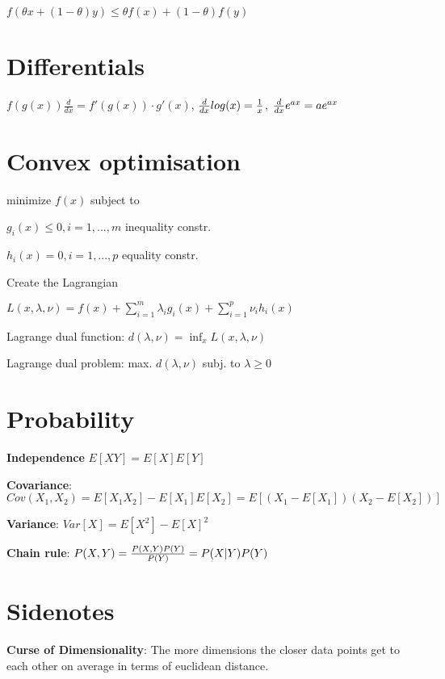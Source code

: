 \documentclass[a4paper,11pt,twocolumn]{article}
\begin{document}
$f(\theta x + (1-\theta)y) \leq \theta f(x) + (1-\theta) f(y)$

\section{Differentials}

$ f(g(x)) \frac{d}{dx} = f'(g(x)) \cdot g'(x)$, $ {d \over {dx}} log(x) = {1 \over x}$, $ {d \over {dx}} e^{ax} = ae^{ax}$



\section{Convex optimisation}

minimize $f(x)$ subject to 

$g_i(x) \leq 0, i = 1,...,m$ inequality constr.

$h_i(x) = 0, i = 1,...,p$ equality constr.

Create the Lagrangian

$L(x, \lambda, \nu) = f(x) + \sum_{i=1}^m{\lambda_i g_i(x) + \sum_{i=1}^p{\nu_i h_i(x)}}$

Lagrange dual function: $ d(\lambda, \nu) = \inf_{x} L (x,\lambda, \nu) $

Lagrange dual problem: max. $d(\lambda, \nu)$  subj. to $\lambda \geq 0$

\section{Probability}

\textbf{Independence} $E[XY] = E[X] E[Y]$

\textbf{Covariance}: $Cov(X_1, X_2) = E[X_1 X_2] - E[X_1] E[X_2] = E[(X_1 - E[X_1])(X_2-E[X_2])]$

\textbf{Variance}: $Var[X] = E[X^2] - E[X]^2$


\textbf{Chain rule}: $P(X,Y) = {{P(X,Y)P(Y)}\over{P(Y)}} = P(X|Y)P(Y)$

\section{Sidenotes}

\textbf{Curse of Dimensionality}: The more dimensions the closer data points get to each other on average in terms of euclidean distance.
\end{document}
